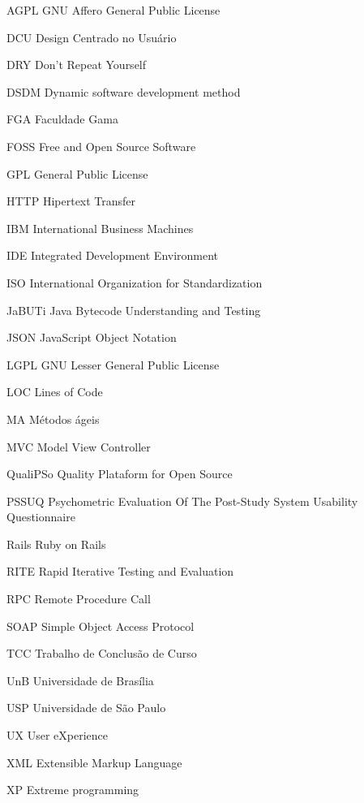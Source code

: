 \begin{siglas}

    	\item[AGPL] GNU Affero General Public License
	\item[DCU] Design Centrado no Usuário
	\item[DRY] Don't Repeat Yourself  	
  	\item[DSDM] Dynamic software development method  
	\item[FGA] Faculdade Gama
	\item[FOSS] Free and Open Source Software
	\item[GPL] General Public License
	\item[HTTP] Hipertext Transfer	
	\item[IBM] International Business Machines
	\item[IDE] Integrated Development Environment
	\item[ISO] International Organization for Standardization  	
	\item[JaBUTi] Java Bytecode Understanding and Testing	
	\item[JSON] JavaScript Object Notation
	\item[LGPL] GNU Lesser General Public License
	\item[LOC] Lines of Code	
	\item[MA] Métodos ágeis
	\item[MVC] Model View Controller
	\item[QualiPSo] Quality Plataform for Open Source
	\item[PSSUQ] Psychometric Evaluation Of The Post-Study System Usability Questionnaire
	\item[Rails] Ruby on Rails	
	\item[RITE] Rapid Iterative Testing and Evaluation
	\item[RPC] Remote Procedure Call	
	\item[SOAP] Simple Object Access Protocol	
	\item[TCC] Trabalho de Conclusão de Curso					  
	\item[UnB] Universidade de Brasília
	\item[USP] Universidade de São Paulo	
	\item[UX] User eXperience
	\item[XML] Extensible Markup Language
	\item[XP] Extreme programming  
  
\end{siglas}
